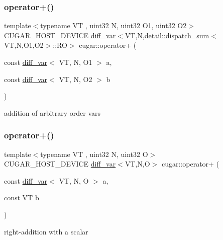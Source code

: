 \subsubsection{\texorpdfstring{operator+()}{operator+()}\hspace{0.1cm}{\footnotesize\ttfamily [1/3]}}
{\footnotesize\ttfamily template$<$typename VT , uint32 N, uint32 O1, uint32 O2$>$ \\
C\+U\+G\+A\+R\+\_\+\+H\+O\+S\+T\+\_\+\+D\+E\+V\+I\+CE \hyperlink{structcugar_1_1diff__var}{diff\+\_\+var}$<$VT,N,\hyperlink{structcugar_1_1detail_1_1dispatch__sum}{detail\+::dispatch\+\_\+sum}$<$VT,N,O1,O2$>$\+::RO$>$ cugar\+::operator+ (\begin{DoxyParamCaption}\item[{const \hyperlink{structcugar_1_1diff__var}{diff\+\_\+var}$<$ VT, N, O1 $>$}]{a,  }\item[{const \hyperlink{structcugar_1_1diff__var}{diff\+\_\+var}$<$ VT, N, O2 $>$}]{b }\end{DoxyParamCaption})\hspace{0.3cm}{\ttfamily [inline]}}

addition of arbitrary order vars \mbox{\label{group___auto_diff_module_gac73e44f611bc7ebbcf9d2e3492b81976}} 
\subsubsection{\texorpdfstring{operator+()}{operator+()}\hspace{0.1cm}{\footnotesize\ttfamily [2/3]}}
{\footnotesize\ttfamily template$<$typename VT , uint32 N, uint32 O$>$ \\
C\+U\+G\+A\+R\+\_\+\+H\+O\+S\+T\+\_\+\+D\+E\+V\+I\+CE \hyperlink{structcugar_1_1diff__var}{diff\+\_\+var}$<$VT,N,O$>$ cugar\+::operator+ (\begin{DoxyParamCaption}\item[{const \hyperlink{structcugar_1_1diff__var}{diff\+\_\+var}$<$ VT, N, O $>$}]{a,  }\item[{const VT}]{b }\end{DoxyParamCaption})\hspace{0.3cm}{\ttfamily [inline]}}

right-\/addition with a scalar \mbox{\label{group___auto_diff_module_gafde6513cdae3834b1bd130607df39356}} 
